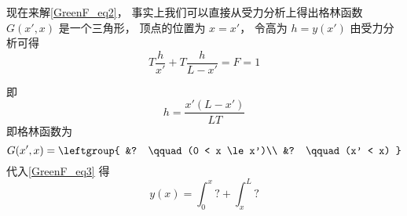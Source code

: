 现在来解\autoref{GreenF_eq2}， 事实上我们可以直接从受力分析上得出格林函数 $G(x', x)$ 是一个三角形， 顶点的位置为 $x = x'$， 令高为 $h = y(x')$ 由受力分析可得
\begin{equation}
T\frac{h}{x'} + T\frac{h}{L - x'} = F = 1
\end{equation}

即
\begin{equation}
h = \frac{x' (L - x')}{LT}
\end{equation}
即格林函数为
\begin{equation}
G(x', x) = \leftgroup{
&? \qquad (0 < x \le x')\\
&? \qquad (x' < x)
}\end{equation}
代入\autoref{GreenF_eq3} 得
\begin{equation}
y(x) = \int_0^x ? + \int_x^L ?
\end{equation}

